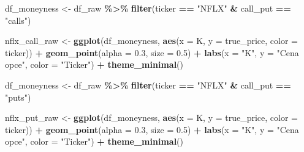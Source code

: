 \documentclass[
]{article}
\newenvironment{Shaded}{\begin{snugshade}}{\end{snugshade}}
\newcommand{\AttributeTok}[1]{\textcolor[rgb]{0.13,0.29,0.53}{#1}}
\newcommand{\FloatTok}[1]{\textcolor[rgb]{0.00,0.00,0.81}{#1}}
\newcommand{\FunctionTok}[1]{\textcolor[rgb]{0.13,0.29,0.53}{\textbf{#1}}}
\newcommand{\NormalTok}[1]{#1}
\newcommand{\OtherTok}[1]{\textcolor[rgb]{0.56,0.35,0.01}{#1}}
\newcommand{\SpecialCharTok}[1]{\textcolor[rgb]{0.81,0.36,0.00}{\textbf{#1}}}
\newcommand{\StringTok}[1]{\textcolor[rgb]{0.31,0.60,0.02}{#1}}
\begin{document}
\begin{Shaded}
\begin{Highlighting}[]
\NormalTok{df\_moneyness }\OtherTok{\textless{}{-}}\NormalTok{ df\_raw }\SpecialCharTok{\%\textgreater{}\%} \FunctionTok{filter}\NormalTok{(ticker }\SpecialCharTok{==} \StringTok{"NFLX"} \SpecialCharTok{\&}\NormalTok{ call\_put }\SpecialCharTok{==} \StringTok{"calls"}\NormalTok{)}

\NormalTok{nflx\_call\_raw }\OtherTok{\textless{}{-}} \FunctionTok{ggplot}\NormalTok{(df\_moneyness, }\FunctionTok{aes}\NormalTok{(}\AttributeTok{x =}\NormalTok{ K, }\AttributeTok{y =}\NormalTok{ true\_price, }\AttributeTok{color =}\NormalTok{ ticker)) }\SpecialCharTok{+}
  \FunctionTok{geom\_point}\NormalTok{(}\AttributeTok{alpha =} \FloatTok{0.3}\NormalTok{, }\AttributeTok{size =} \FloatTok{0.5}\NormalTok{) }\SpecialCharTok{+}
  \FunctionTok{labs}\NormalTok{(}\AttributeTok{x =} \StringTok{"K"}\NormalTok{, }\AttributeTok{y =} \StringTok{"Cena opce"}\NormalTok{,}
       \AttributeTok{color =} \StringTok{"Ticker"}\NormalTok{) }\SpecialCharTok{+}
  \FunctionTok{theme\_minimal}\NormalTok{()}
\end{Highlighting}
\end{Shaded}

\begin{Shaded}
\begin{Highlighting}[]
\NormalTok{df\_moneyness }\OtherTok{\textless{}{-}}\NormalTok{ df\_raw }\SpecialCharTok{\%\textgreater{}\%} \FunctionTok{filter}\NormalTok{(ticker }\SpecialCharTok{==} \StringTok{"NFLX"} \SpecialCharTok{\&}\NormalTok{ call\_put }\SpecialCharTok{==} \StringTok{"puts"}\NormalTok{)}

\NormalTok{nflx\_put\_raw }\OtherTok{\textless{}{-}} \FunctionTok{ggplot}\NormalTok{(df\_moneyness, }\FunctionTok{aes}\NormalTok{(}\AttributeTok{x =}\NormalTok{ K, }\AttributeTok{y =}\NormalTok{ true\_price, }\AttributeTok{color =}\NormalTok{ ticker)) }\SpecialCharTok{+}
  \FunctionTok{geom\_point}\NormalTok{(}\AttributeTok{alpha =} \FloatTok{0.3}\NormalTok{, }\AttributeTok{size =} \FloatTok{0.5}\NormalTok{) }\SpecialCharTok{+}
  \FunctionTok{labs}\NormalTok{(}\AttributeTok{x =} \StringTok{"K"}\NormalTok{, }\AttributeTok{y =} \StringTok{"Cena opce"}\NormalTok{,}
       \AttributeTok{color =} \StringTok{"Ticker"}\NormalTok{) }\SpecialCharTok{+}
  \FunctionTok{theme\_minimal}\NormalTok{()}
\end{Highlighting}
\end{Shaded}
\end{document}
